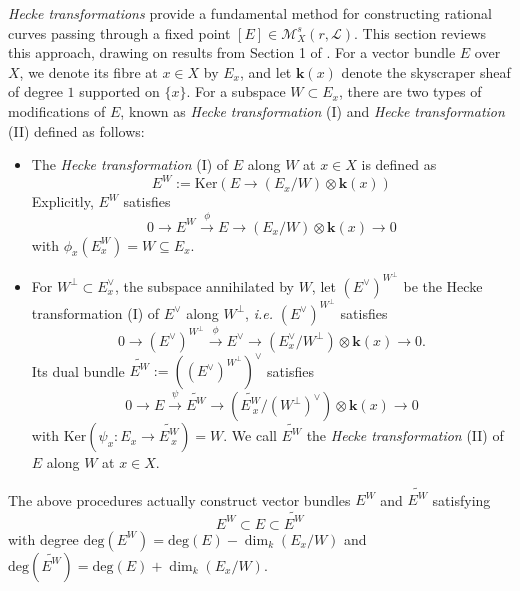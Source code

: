 \documentclass{kms-b}
\numberwithin{equation}{section}
\theoremstyle{plain}
\theoremstyle{definition}
\theoremstyle{remark}
\begin{document}
\emph{Hecke transformations} provide a fundamental method for constructing rational curves passing through a fixed point $[E]\in\mathcal{M}^s_X(r,\mathcal{L})$. This section reviews this approach, drawing on results from Section 1 of \cite{Sun05}.
For a vector bundle $E$ over $X$, we denote its fibre at $x\in X$ by $E_x$, and let $\textbf{k}(x)$ denote the skyscraper sheaf of degree $1$ supported on $\{x\}$. For a subspace $W\subset E_x$, there are two types of modifications of $E$, known as \emph{Hecke transformation} (I) and \emph{Hecke transformation} (II) defined as follows:
\begin{itemize}
    \item [(I)] The \emph{Hecke transformation} (I) of $E$ along $W$ at $x \in X$ is defined as $$E^W:=\mathrm{Ker}(E\to (E_x/W)\otimes\textbf{k}(x))$$
    Explicitly, $E^W$ satisfies
    $$0\to E^W \xrightarrow{\phi} E \to (E_x/W)\otimes\textbf{k}(x)\to 0$$
    with $\phi_x(E^W_x)=W \subseteq E_x$.
    \newline
    \item[(II)] For $W^{\bot} \subset E_x^{\vee}$, the subspace annihilated by $W$, let $(E^{\vee})^{W^{\bot}}$ be the Hecke transformation (I) of  $E^\vee$ along $W^{\bot}$, \emph{i.e.} $(E^{\vee})^{W^{\bot}}$ satisfies 
    $$0\to(E^{\vee})^{W^{\bot}} \xrightarrow{\phi} E^{\vee} \to (E_x^{\vee}/W^{\bot})\otimes\textbf{k}(x)\to 0.$$
    Its dual bundle $\widetilde{E^W}:=((E^{\vee})^{W^{\bot}})^{\vee}$ satisfies 
    $$0 \to E \xrightarrow{\psi} \widetilde{E^W} \to (\widetilde{E_{\ x}^W}/(W^{\bot})^{\vee})\otimes \textbf{k}(x) \to 0$$
    with $\mathrm{Ker}(\psi_x: E_x \to \widetilde{E_{\ x}^W})=W$. We call $\widetilde{E^W}$ the  \emph{Hecke transformation} (II) of $E$ along $W$ at $x \in X$.
\end{itemize}
The above procedures actually construct vector bundles $E^W$ and $\widetilde{E^W}$ satisfying
$$E^W \subset E \subset \widetilde{E^W}$$ with degree $\mathrm{deg}(E^W)=\mathrm{deg}(E)-\dim_k(E_x/W)$ and $\mathrm{deg}(\widetilde{E^W})= \mathrm{deg}(E)+\dim_k(E_x/W)$.
\end{document}
